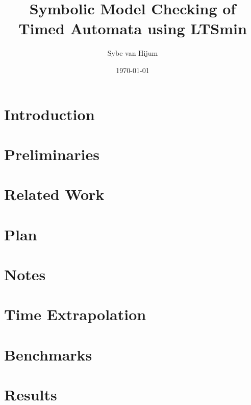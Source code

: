\documentclass[11pt,a4paper]{article}
\newcommand{\ltsmin}{LTSmin}
\begin{document}
\newtheorem{mydef}{Definition}
\title{Symbolic Model Checking of Timed Automata using \ltsmin{}}
\author{Sybe van Hijum}
\date{\today{}}
\maketitle

\clearpage
\tableofcontents

\clearpage
\section{Introduction}


%

\clearpage
\section{Preliminaries}


\clearpage
\section{Related Work}


\clearpage
\section{Plan}


\clearpage
\section{Notes}


\clearpage
\section{Time Extrapolation}


\clearpage
\section{Benchmarks}


\clearpage
\section{Results}


\clearpage
{}

\end{document}
